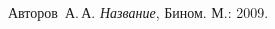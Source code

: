 \begin{thebibliography}{0}
	 Авторов~А.\,А.
	\emph{Название}, Бином. М.: 2009.
\end{thebibliography}